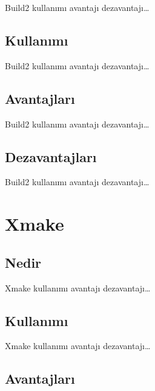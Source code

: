 \documentclass[
]{book}
\begin{document}
Build2 kullanımı avantajı dezavantajı\ldots{}

\hypertarget{kullanux131mux131-7}{%
\section*{Kullanımı}\label{kullanux131mux131-7}}

Build2 kullanımı avantajı dezavantajı\ldots{}

\hypertarget{avantajlarux131-7}{%
\section*{Avantajları}\label{avantajlarux131-7}}

Build2 kullanımı avantajı dezavantajı\ldots{}

\hypertarget{dezavantajlarux131-7}{%
\section*{Dezavantajları}\label{dezavantajlarux131-7}}

Build2 kullanımı avantajı dezavantajı\ldots{}

\hypertarget{xmake}{%
\chapter*{Xmake}\label{xmake}}

\hypertarget{nedir-8}{%
\section*{Nedir}\label{nedir-8}}

Xmake kullanımı avantajı dezavantajı\ldots{}

\hypertarget{kullanux131mux131-8}{%
\section*{Kullanımı}\label{kullanux131mux131-8}}

Xmake kullanımı avantajı dezavantajı\ldots{}

\hypertarget{avantajlarux131-8}{%
\section*{Avantajları}\label{avantajlarux131-8}}
\end{document}
